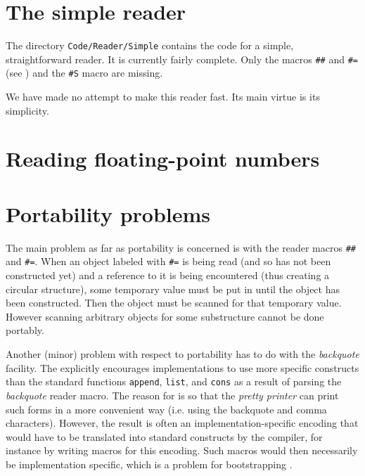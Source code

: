 \section{The simple reader}

The directory \texttt{Code/Reader/Simple} contains the code for a
simple, straightforward reader.  It is currently fairly complete.
Only the macros \texttt{\#\#} and \texttt{\#=} (see
) and the \texttt{\#S} macro
are missing.  

We have made no attempt to make this reader fast.  Its main virtue is
its simplicity.

\section{Reading floating-point numbers}

\section{Portability problems}
\label{sec-reader-portability-problems}

The main problem as far as portability is concerned is with the reader
macros \texttt{\#\#} and \texttt{\#=}.  When an object labeled with
\texttt{\#=} is being read (and so has not been constructed yet) and a
reference to it is being encountered (thus creating a circular
structure), some temporary value must be put in until the object has
been constructed.  Then the object must be scanned for that temporary
value.  However scanning arbitrary objects for some substructure
cannot be done portably.

Another (minor) problem with respect to portability has to do with the
\emph{backquote} facility.  The \hs{} explicitly encourages
implementations to use more specific constructs than the standard
\commonlisp{} functions \texttt{append}, \texttt{list}, and
\texttt{cons} as a result of parsing the \emph{backquote} reader
macro.  The reason for is so that the \emph{pretty printer} can print
such forms in a more convenient way (i.e. using the backquote and
comma characters).  However, the result is often an
implementation-specific encoding that would have to be translated into
standard \commonlisp{} constructs by the compiler, for instance by
writing macros for this encoding.  Such macros would then necessarily
be implementation specific, which is a problem for bootstrapping
\sysname{}.
